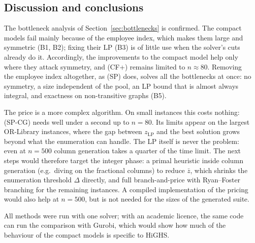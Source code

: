 \subsection{Discussion and conclusions}
\label{sec:conclusions}

The bottleneck analysis of Section~\ref{sec:bottlenecks} is confirmed. The
compact models fail mainly because of the employee index, which makes them
large and symmetric (B1, B2); fixing their LP (B3) is of little use when the
solver's cuts already do it. Accordingly, the improvements to the compact
model help only where they attack symmetry, and (CF+) remains limited to
$n\approx80$. Removing the employee index altogether, as (SP) does, solves
all the bottlenecks at once: no symmetry, a size independent of the pool, an
LP bound that is almost always integral, and exactness on non-transitive
graphs (B5).

The price is a more complex algorithm. On small instances this costs
nothing: (SP-CG) needs well under a second up to $n=80$. Its limits appear on
the largest OR-Library instances, where the gap between $z_{\mathrm{LP}}$
and the best solution grows beyond what the enumeration can handle. The
LP itself is never the problem: even at $n=500$ column generation takes a
quarter of the time limit. The next steps would therefore target the
integer phase: a primal heuristic inside column generation (e.g.\ diving on
the fractional columns) to reduce $\bar z$, which shrinks the enumeration
threshold $\Delta$ directly, and full branch-and-price with Ryan--Foster~\cite{ryan1981}
branching for the remaining instances. A compiled implementation of the
pricing would also help at $n=500$, but is not needed for the sizes of the
generated suite.

All methods were run with one solver; with an academic licence, the same
code can run the comparison with Gurobi, which would show how much of the
behaviour of the compact models is specific to HiGHS.
